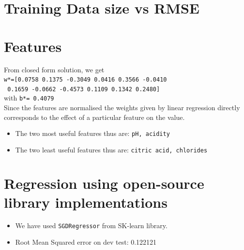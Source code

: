 \documentclass[12pt]{article}
\begin{document}
\section{Training Data size vs RMSE}
    \begin{center}
    \end{center}
\section{Features}
From closed form solution, we get\\
\texttt{w*=[0.0758 0.1375 -0.3049 0.0416 0.3566 -0.0410}\\
\texttt{ 0.1659 -0.0662 -0.4573 0.1109 0.1342 0.2480]}\\
with \texttt{b*= 0.4079}\\
Since the features are normalised  the weights given by linear regression directly corresponds to the effect of a particular feature on the value.
\begin{itemize}
    \item The two most useful features thus are:  \texttt{pH, acidity}
    \item The two least useful features thus are:  \texttt{citric acid, chlorides}
\end{itemize}

\section{Regression using open-source library implementations}   
\begin{itemize}
    \item We have used \texttt{SGDRegressor} from SK-learn library.
    \item Root Mean Squared error on dev test: 0.122121
\end{itemize}
\end{document}
